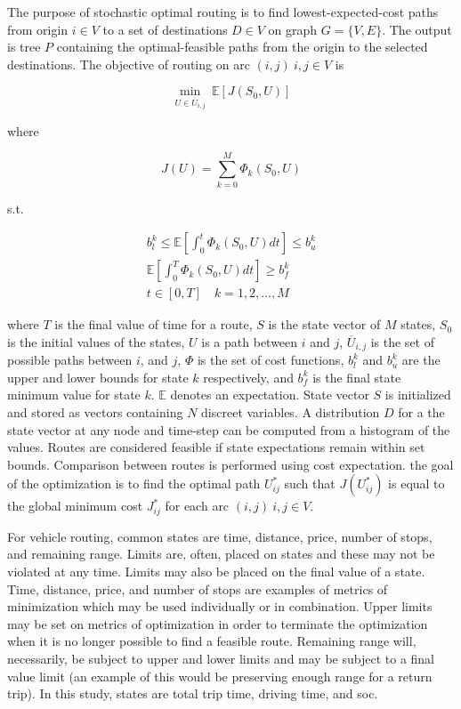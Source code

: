 The purpose of stochastic optimal routing is to find lowest-expected-cost paths from origin $i \in V$ to a set of destinations $D \in V$ on graph $G = \{V, E\}$. The output is tree $P$ containing the optimal-feasible paths from the origin to the selected destinations. The objective of routing on arc $(i,j)\ i, j \in V$ is

\begin{equation}
	\min_{U \in \overline{U}_{i,j}}\ \mathbb{E}[J(S_0, U)]
\end{equation}

where

\begin{equation}
	J(U) = \sum_{k = 0}^M \Phi_k(S_0, U)
\end{equation}

s.t.

\begin{gather}	
	b^k_l \leq \mathbb{E}\left[\int_0^t \Phi_k(S_0, U)dt\right] \leq b^k_u\\
	\mathbb{E}\left[\int_0^T \Phi_k(S_0, U)dt\right] \geq b^k_f\\
	t \in [0, T]\quad k = 1, 2, \dots, M
\end{gather}

\noindent where $T$ is the final value of time for a route, $S$ is the state vector of $M$ states, $S_0$ is the initial values of the states, $U$ is a path between $i$ and $j$, $\overline{U}_{i,j}$ is the set of possible paths between $i$, and $j$, $\Phi$ is the set of cost functions, $b^k_l$ and $b^k_u$ are the upper and lower bounds for state $k$ respectively, and $b^k_f$ is the final state minimum value for state $k$. $\mathbb{E}$ denotes an expectation. State vector $S$ is initialized and stored as vectors containing $N$ discreet variables. A distribution $D$ for a the state vector at any node and time-step can be computed from a histogram of the values. Routes are considered feasible if state expectations remain within set bounds. Comparison between routes is performed using cost expectation. the goal of the optimization is to find the optimal path $U_{ij}^*$ such that $J(U_{ij}^*)$ is equal to the global minimum cost $J_{ij}^*$ for each arc $(i,j)\ i,j\in V$.

For vehicle routing, common states are time, distance, price, number of stops, and remaining range. Limits are, often, placed on states and these may not be violated at any time. Limits may also be placed on the final value of a state. Time, distance, price, and number of stops are examples of metrics of minimization which may be used individually or in combination. Upper limits may be set on metrics of optimization in order to terminate the optimization when it is no longer possible to find a feasible route. Remaining range will, necessarily, be subject to upper and lower limits and may be subject to a final value limit (an example of this would be preserving enough range for a return trip). In this study, states are total trip time, driving time, and \gls{soc}.

